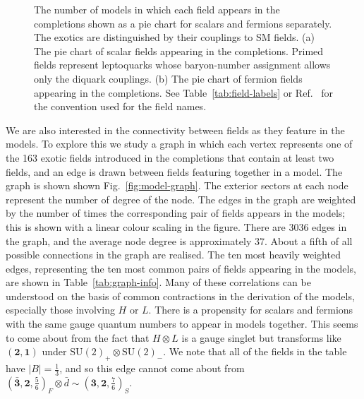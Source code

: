 \begin{figure}
  \centering
  \caption{The number of models in which each field appears in the completions
    shown as a pie chart for scalars and fermions separately. The exotics are
    distinguished by their couplings to SM fields. (a) The pie chart of scalar
    fields appearing in the completions. Primed fields represent leptoquarks
    whose baryon-number assignment allows only the diquark couplings. (b) The
    pie chart of fermion fields appearing in the completions. See
    Table~\ref{tab:field-labels} or Ref.~\cite{deBlas:2017xtg} for the
    convention used for the field names.}
  \label{fig:field-piecharts}
\end{figure}

We are also interested in the connectivity between fields as they feature in the
models. To explore this we study a graph in which each vertex represents one of
the 163 exotic fields introduced in the completions that contain at least two
fields, and an edge is drawn between fields featuring together in a model. The
graph is shown shown Fig.~\ref{fig:model-graph}. The exterior sectors at each
node represent the number of degree of the node. The edges in the graph are
weighted by the number of times the corresponding pair of fields appears in the
models; this is shown with a linear colour scaling in the figure. There are 3036
edges in the graph, and the average node degree is approximately 37. About a
fifth of all possible connections in the graph are realised. The ten most
heavily weighted edges, representing the ten most common pairs of fields
appearing in the models, are shown in Table~\ref{tab:graph-info}. Many of these
correlations can be understood on the basis of common contractions in the
derivation of the models, especially those involving $H$ or $L$. There is a
propensity for scalars and fermions with the same gauge quantum numbers to
appear in models together. This seems to come about from the fact that
$H \otimes L$ is a gauge singlet but transforms like $(\mathbf{2}, \mathbf{1})$
under $\mathrm{SU}(2)_{+} \otimes \mathrm{SU}(2)_{-}$. We note that all of the
fields in the table have $|B| = \tfrac{1}{3}$, and so this edge cannot come
about from
$(\mathbf{\bar{3}}, \mathbf{2}, \tfrac{5}{6})_{F} \otimes \bar{d} \sim (\mathbf{3}, \mathbf{2}, \tfrac{7}{6})_{S}$.

